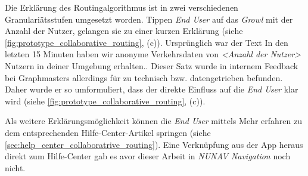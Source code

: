 Die Erklärung des Routingalgorithmus ist in zwei verschiedenen Granulariätsstufen umgesetzt worden. Tippen \textit{End User} auf das \textit{Growl} mit der Anzahl der Nutzer, gelangen sie zu einer kurzen Erklärung (siehe \autoref{fig:prototype_collaborative_routing}, (c)). Ursprünglich war der Text \glqq In den letzten 15 Minuten haben wir anonyme Verkehrsdaten von \textit{<Anzahl der Nutzer>} Nutzern in deiner Umgebung erhalten.\grqq{}. Dieser Satz wurde in internem Feedback bei Graphmasters allerdings für zu technisch bzw. datengetrieben befunden. Daher wurde er so umformuliert, dass der direkte Einfluss auf die \textit{End User} klar wird (siehe \autoref{fig:prototype_collaborative_routing}, (c)).

Als weitere Erklärungsmöglichkeit können die \textit{End User} mittels \glqq Mehr erfahren\grqq{} zu dem entsprechenden Hilfe-Center-Artikel springen (siehe \autoref{sec:help_center_collaboratrive_routing}). Eine Verknüpfung aus der App heraus direkt zum Hilfe-Center gab es avor dieser Arbeit in \textit{NUNAV Navigation} noch nicht.

